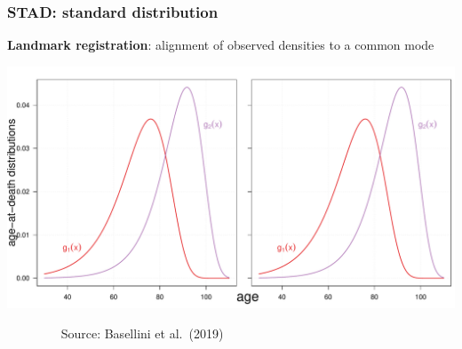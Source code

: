 \documentclass[12pt, xcolor=table]{beamer}  %
\begin{document}
\begin{frame}[noframenumbering]\frametitle{STAD: standard distribution}

\vspace{-0.3cm}
	
	\begin{center}
		
		\color{white} \textbf{Landmark registration}: alignment of observed densities to a common mode
		
		\vspace{0.3cm}
		
		\includegraphics[scale=.35]{Figures/Ch2/F8_1.pdf}
		
	\end{center}

\vspace{-0.15cm}
\scriptsize{$\quad\quad\quad\quad$ Source: Basellini et al.~(2019)}
	
\end{frame}	
\end{document}
